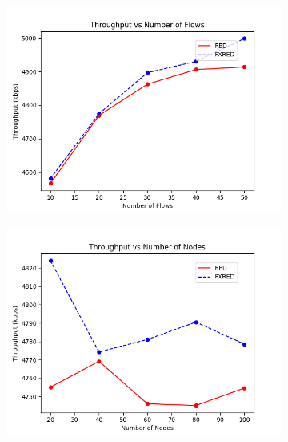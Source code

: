 \documentclass[10pt]{report}
\begin{document}
\begin{figure}
    \centering
    \begin{subfigure}{.5\textwidth}
        \includegraphics[width=1\linewidth]{static/graphs/wired/Throughput vs Number of Flows.png}
    \end{subfigure}%
    \begin{subfigure}{.5\textwidth}
        \includegraphics[width=1\linewidth]{static/graphs/wired/Throughput vs Number of Nodes.png}
    \end{subfigure}


\end{figure}
\end{document}
